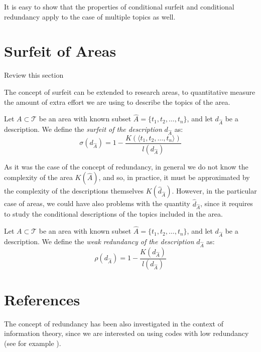 It is easy to show that the properties of conditional surfeit and conditional redundancy apply to the case of multiple topics as well.

%
%

\section{Surfeit of Areas}

{\color{red} Review this section}

The concept of surfeit can be extended to research areas, to quantitative measure the amount of extra effort we are using to describe the topics of the area.

\begin{definition}
Let $A \subset \mathcal{T}$ be an area with known subset $\hat{A} = \{t_1, t_2, \ldots, t_n\}$, and let $d_{\hat{A}}$ be a description. We define the \emph{surfeit of the description} $d_{\hat{A}}$ as:
\[
\sigma \left( d_{\hat{A}} \right) = 1  - \frac{K( \langle t_1, t_2, \ldots, t_n \rangle )}{l \left( d_{\hat{A}} \right)}
\]
\end{definition}

As it was the case of the concept of redundancy, in general we do not know the complexity of the area $K(\hat{A})$, and so, in practice, it must be approximated by the complexity of the descriptions themselves $K(\hat{d}_{\hat{A}})$. However, in the particular case of areas, we could have also problems with the quantity $\hat{d}_{\hat{A}}$, since it requires to study the conditional descriptions of the topics included in the area.

\begin{definition}
Let $A \subset \mathcal{T}$ be an area with known subset $\hat{A} = \{t_1, t_2, \ldots, t_n\}$, and let $d_{\hat{A}}$ be a description. We define the \emph{weak redundancy of the description} $d_{\hat{A}}$ as:
\[
\rho(d_{\hat{A}}) =  1  - \frac{K \left( d_{\hat{A}} \right)}{l \left( d_{\hat{A}} \right)}
\]
\end{definition}

%
%

\section*{References}

The concept of redundancy has been also investigated in the context of information theory, since we are interested on using codes with low redundancy (see for example \cite{abramson1963information}).

